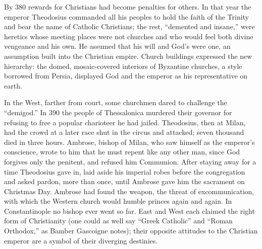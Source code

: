 By 380 rewards for Christians had become penalties for others. In that year the emperor Theodosius
commanded all his peoples to hold the faith of the Trinity and bear the name of Catholic Christians;
the rest, ``demented and insane,'' were heretics whose meeting places were not churches and who would
feel both divine vengeance and his own. He assumed that his will and God's were one, an assumption
built into the Christian empire. Church buildings expressed the new hierarchy: the domed,
mosaic-covered interiors of Byzantine churches, a style borrowed from Persia, displayed God and the
emperor as his representative on earth.

In the West, farther from court, some churchmen dared to challenge the ``demigod.'' In 390 the
people of Thessalonica murdered their governor for refusing to free a popular charioteer he had
jailed. Theodosius, then at Milan, had the crowd at a later race shut in the circus and attacked;
seven thousand died in three hours. Ambrose, bishop of Milan, who saw himself as the emperor's
conscience, wrote to him that he must repent like any other man, since God forgives only the
penitent, and refused him Communion. After staying away for a time Theodosius gave in, laid aside his
imperial robes before the congregation and asked pardon, more than once, until Ambrose gave him the
sacrament on Christmas Day. Ambrose had found the weapon, the threat of excommunication, with which
the Western church would humble princes again and again. In Constantinople no bishop ever went so
far. East and West each claimed the right form of Christianity (one could as well say ``Greek
Catholic'' and ``Roman Orthodox,'' as Bamber Gascoigne notes); their opposite attitudes to the
Christian emperor are a symbol of their diverging destinies.

\begin{keyfacts}
\end{keyfacts}
